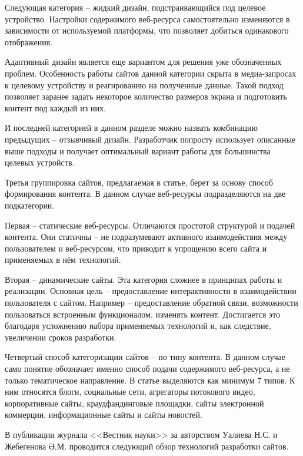 Следующая категория -- жидкий дизайн, подстраивающийся под целевое устройство.
Настройки содержимого веб-ресурса самостоятельно изменяются в зависимости от используемой платформы, что позволяет добиться одинакового отображения.

Адаптивный дизайн является еще вариантом для решения уже обозначенных проблем.
Особенность работы сайтов данной категории скрыта в медиа-запросах к целевому устройству и реагированию на полученные данные.
Такой подход позволяет заранее задать некоторое количество размеров экрана и подготовить контент под каждый из них.

И последней категорией в данном разделе можно назвать комбинацию предыдущих -- отзывчивый дизайн.
Разработчик попросту использует описанные выше подходы и получает оптимальный вариант работы для большинства целевых устройств.


Третья группировка сайтов, предлагаемая в статье, берет за основу способ формирования контента.
В данном случае веб-ресурсы подразделяются на две подкатегории.

Первая -- статические веб-ресурсы.
Отличаются простотой структурой и подачей контента.
Они статичны -- не подразумевают активного взаимодействия между пользователем и веб-ресурсом, что приводит к упрощению всего сайта и применяемых в нём технологий.

Вторая -- динамические сайты.
Эта категория сложнее в принципах работы и реализации.
Основная цель -- предоставление интерактивности в взаимодействии пользователя с сайтом.
Например -- предоставление обратной связи, возможности пользоваться встроенным функционалом, изменять контент.
Достигается это благодаря усложнению набора применяемых технологий и, как следствие, увеличении сроков разработки.


Четвертый способ категоризации сайтов -- по типу контента.
В данном случае само понятие обозначает именно способ подачи содержимого веб-ресурса, а не только тематическое направление.
В статье выделяются как минимум 7 типов.
К ним относятся блоги, социальные сети, агрегаторы потокового видео, корпоративные сайты, краудфандинговые площадки, сайты электронной коммерции, информационные сайты и сайты новостей.


В публикации журнала <<Вестник науки>> за авторством Уалиева Н.С. и Жебегенова Ә.М. \cite{ualiev-jebegenov-issledovanie} проводится следующий обзор технологий разработки сайтов.

